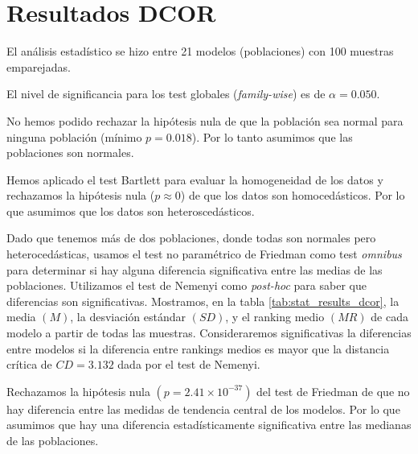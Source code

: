 \documentclass[a4paper,oneside,11pt,leqno]{article}
\begin{document}
	\section{Resultados DCOR}
	\label{sec:results_dcor}
	
	El análisis estadístico se hizo entre 21 modelos (poblaciones) con 100 muestras emparejadas.
	
	El nivel de significancia para los test globales (\textit{family-wise}) es de $\alpha=0.050$.
	
	No hemos podido rechazar la hipótesis nula de que la población sea normal para ninguna población (mínimo $p=0.018$). Por lo tanto asumimos que las poblaciones son normales.
	
	Hemos aplicado el test Bartlett para evaluar la homogeneidad de los datos y rechazamos la hipótesis nula ($p\approx 0$) de que los datos son homocedásticos. Por lo que asumimos que los datos son heteroscedásticos.
	
	Dado que tenemos más de dos poblaciones, donde todas son normales pero heterocedásticas, usamos el test no paramétrico de Friedman como test \textit{omnibus} para determinar si hay alguna diferencia significativa entre las medias de las poblaciones. Utilizamos el test de Nemenyi como \textit{post-hoc} para saber que diferencias son significativas. Mostramos, en la tabla \ref{tab:stat_results_dcor}, la media $(M)$, la desviación estándar $(SD)$, y el ranking medio $(MR)$ de cada modelo a partir de todas las muestras. Consideraremos significativas la diferencias entre modelos si la diferencia entre rankings medios es mayor que la distancia crítica de $CD=3.132$ dada por el test de Nemenyi.

	Rechazamos la hipótesis nula $(p=2.41\times 10^{-37})$ del test de Friedman de que no hay diferencia entre las medidas de tendencia central de los modelos. Por lo que asumimos que hay una diferencia estadísticamente significativa entre las medianas de las poblaciones.
	
\end{document}
